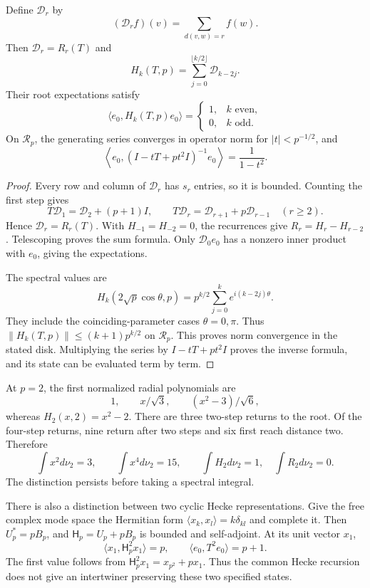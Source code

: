 \begin{proposition}
\label{v4-arith:hecke:prop:distance}
Define $\mathcal D_r$ by
\[
 (\mathcal D_rf)(v)=\sum_{d(v,w)=r}f(w).
\]
Then $\mathcal D_r=R_r(T)$ and
\[
 H_k(T,p)=\sum_{j=0}^{\lfloor k/2\rfloor}\mathcal D_{k-2j}.
\]
Their root expectations satisfy
\[
 \langle e_0,H_k(T,p)e_0\rangle=
 \begin{cases}1,&k\text{ even},\\0,&k\text{ odd}.
 \end{cases}
\]
On $\mathcal R_p$, the generating series converges in operator norm
for $|t|<p^{-1/2}$, and
\[
 \left\langle e_0,(I-tT+pt^2I)^{-1}e_0\right\rangle
 =\frac1{1-t^2}.
\]
\end{proposition}
\begin{proof}
Every row and column of $\mathcal D_r$ has $s_r$ entries,
so it is bounded. Counting the first step gives
\[
 T\mathcal D_1=\mathcal D_2+(p+1)I,\qquad
 T\mathcal D_r=\mathcal D_{r+1}+p\mathcal D_{r-1}\quad(r\geq2).
\]
Hence $\mathcal D_r=R_r(T)$.
With $H_{-1}=H_{-2}=0$, the recurrences give $R_r=H_r-H_{r-2}$.
Telescoping proves the sum formula.
Only $\mathcal D_0e_0$ has a nonzero inner product with $e_0$,
giving the expectations.

The spectral values are
\[
 H_k(2\sqrt p\cos\theta,p)
 =p^{k/2}\sum_{j=0}^ke^{i(k-2j)\theta}.
\]
They include the coinciding-parameter cases $\theta=0,\pi$.
Thus $\|H_k(T,p)\|\leq(k+1)p^{k/2}$ on $\mathcal R_p$.
This proves norm convergence in the stated disk.
Multiplying the series by $I-tT+pt^2I$ proves the inverse formula,
and its state can be evaluated term by term.
\end{proof}

At $p=2$, the first normalized radial polynomials are
\[
 1,\qquad x/\sqrt3,\qquad (x^2-3)/\sqrt6,
\]
whereas $H_2(x,2)=x^2-2$.
There are three two-step returns to the root.
Of the four-step returns, nine return after two steps and six
first reach distance two. Therefore
\[
 \int x^2d\nu_2=3,\qquad \int x^4d\nu_2=15,\qquad
 \int H_2d\nu_2=1,\quad \int R_2d\nu_2=0.
\]
The distinction persists before taking a spectral integral.

There is also a distinction between two cyclic Hecke representations.
Give the free complex mode space the Hermitian form
$\langle x_k,x_l\rangle=k\delta_{kl}$ and complete it.
Then $U_p^*=pB_p$, and $\mathsf H_p=U_p+pB_p$ is bounded and self-adjoint.
At its unit vector $x_1$,
\[
 \langle x_1,\mathsf H_p^2x_1\rangle=p,
 \qquad \langle e_0,T^2e_0\rangle=p+1.
\]
The first value follows from
$\mathsf H_p^2x_1=x_{p^2}+px_1$.
Thus the common Hecke recursion does not give an intertwiner
preserving these two specified states.

